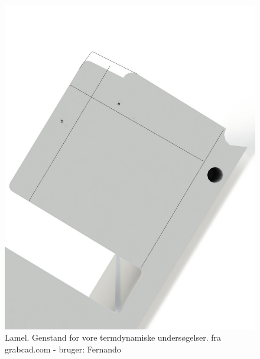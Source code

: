 \begin{figure}
	\centering
	\includegraphics[width=0.7\linewidth]{billeder/lamel}
	\caption{Lamel. Genstand for vore termdynamiske undersøgelser. fra grabcad.com - bruger: Fernando}
	\label{fig:lamel}
\end{figure}